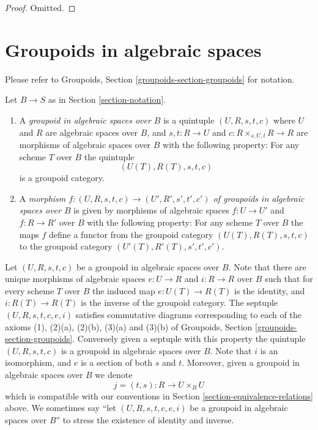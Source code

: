 \begin{proof}
Omitted.
\end{proof}





\section{Groupoids in algebraic spaces}
\label{section-groupoids}

\noindent
Please refer to
Groupoids, Section \ref{groupoids-section-groupoids}
for notation.

\begin{definition}
\label{definition-groupoid}
Let $B \to S$ as in Section \ref{section-notation}.
\begin{enumerate}
\item A {\it groupoid in algebraic spaces over $B$} is a
quintuple $(U, R, s, t, c)$ where
$U$ and $R$ are algebraic spaces over $B$, and
$s, t : R \to U$ and $c : R \times_{s, U, t} R \to R$
are morphisms of algebraic spaces over $B$ with the
following property: For any scheme $T$ over $B$ the quintuple
$$
(U(T), R(T), s, t, c)
$$
is a groupoid category.
\item A {\it morphism
$f : (U, R, s, t, c) \to (U', R', s', t', c')$
of groupoids in algebraic spaces over $B$} is given by morphisms
of algebraic spaces $f : U \to U'$ and $f : R \to R'$ over $B$
with the following property:  For any scheme
$T$ over $B$ the maps $f$ define a functor from the
groupoid category $(U(T), R(T), s, t, c)$ to the
groupoid category $(U'(T), R'(T), s', t', c')$.
\end{enumerate}
\end{definition}

\noindent
Let $(U, R, s, t, c)$ be a groupoid in algebraic spaces over $B$.
Note that there are unique morphisms of algebraic spaces
$e : U \to R$ and $i : R \to R$ over $B$ such that for every scheme $T$
over $B$ the induced map $e : U(T) \to R(T)$ is the identity, and
$i : R(T) \to R(T)$ is the inverse of the groupoid category.
The septuple $(U, R, s, t, c, e, i)$ satisfies commutative diagrams
corresponding to each of the axioms (1), (2)(a), (2)(b), (3)(a) and (3)(b) of
Groupoids, Section \ref{groupoids-section-groupoids}.
Conversely given a septuple with this property the quintuple $(U, R, s, t, c)$
is a groupoid in algebraic spaces over $B$. Note that $i$ is an isomorphism,
and $e$ is a section of both $s$ and $t$.
Moreover, given a groupoid in algebraic spaces over $B$ we denote
$$
j = (t, s) : R \longrightarrow U \times_B U
$$
which is compatible with our conventions in
Section \ref{section-equivalence-relations}
above. We sometimes say ``let $(U, R, s, t, c, e, i)$ be a
groupoid in algebraic spaces over $B$'' to stress the existence of identity and
inverse.

